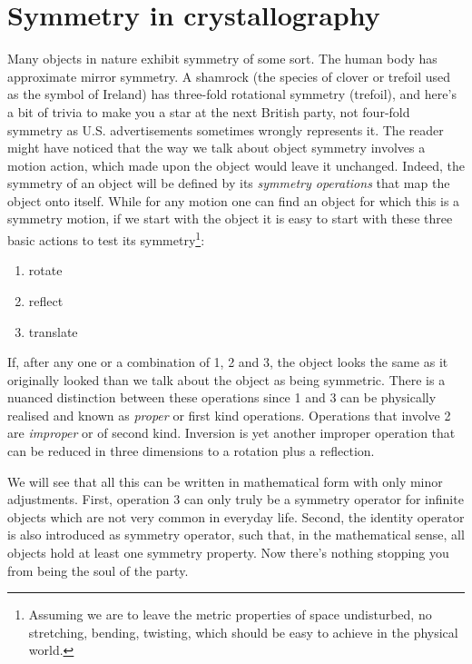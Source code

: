 



\chapter{Symmetry in crystallography}
\label{Chap:Symmetry}
Many objects in nature exhibit symmetry of some sort. The human body has approximate mirror symmetry. A shamrock (the species of clover or trefoil used as the symbol of Ireland) has three-fold rotational symmetry (trefoil), and here's a bit of trivia to make you a star at the next British party, not four-fold symmetry as U.S. advertisements sometimes wrongly represents it. The reader might have noticed that the way we talk about object symmetry involves a motion action, which made upon the object would leave it unchanged. Indeed, the symmetry of an object will be defined by its \textit{symmetry operations} that map the object onto itself. While for any motion one can find an object for which this is a  symmetry motion, if we start with the object it is easy to start with these three basic actions to test its symmetry\footnote{ Assuming we are to leave the metric properties of space undisturbed, \ie no stretching, bending, twisting, which should be easy to achieve in the physical world.}:
\begin{enumerate}
\item rotate
\item reflect
\item translate
\end{enumerate}

If, after any one or a combination of 1, 2 and 3, the object looks the same as it originally looked than we talk about the object as being symmetric. There is a nuanced distinction between these operations since 1 and 3 can be physically realised and known as \textit{proper} or first kind operations. Operations that involve 2 are \textit{improper} or of second kind. Inversion is yet another improper operation that can be reduced in three dimensions to a rotation plus a reflection. 

We will see that all this can be written in mathematical form with only minor adjustments. First, operation 3 can only truly be a symmetry operator for infinite objects which are not very common in everyday life. Second, the identity operator is also introduced as symmetry operator, such that, in the mathematical sense, all objects hold at least one symmetry property. Now there's nothing stopping you from being the soul of the party.

